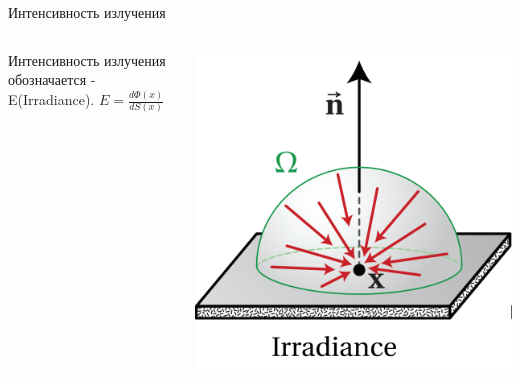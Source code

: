 \documentclass{beamer}
\begin{document}
\begin{frame}{Интенсивность излучения}
	\begin{columns}
			Интенсивность излучения обозначается - E(Irradiance). $E = \frac{d\Phi(x)}{dS(x)}$
		
			\includegraphics[width=\linewidth]{Irradiance.png}
	\end{columns}
\end{frame}
\end{document}
